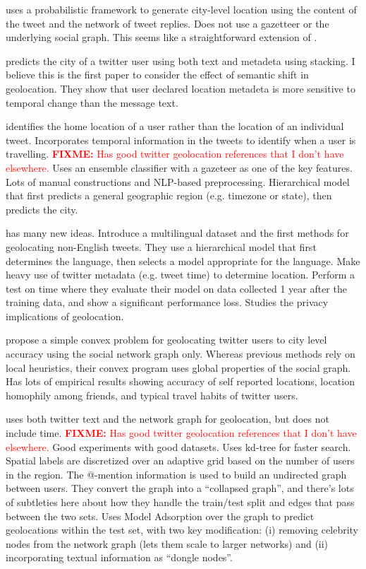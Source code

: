 \documentclass{article}
\newcommand{\fixme}[1]{\textcolor{red}{\textbf{FIXME:} {#1}}}
\begin{document}
\citet{li2012towards} uses a probabilistic framework to generate city-level location using the content of the tweet and the network of tweet replies.
Does not use a gazetteer or the underlying social graph.
This seems like a straightforward extension of \citet{cheng2010you}.

\citet{han2013stacking} predicts the city of a twitter user using both text and metadeta using stacking.
I believe this is the first paper to consider the effect of semantic shift in geolocation.
They show that user declared location metadeta is more sensitive to temporal change than the message text.

\citet{mahmud2014home} identifies the home location of a user rather than the location of an individual tweet.
Incorporates temporal information in the tweets to identify when a user is travelling.
\fixme{Has good twitter geolocation references that I don't have elsewhere.}
Uses an ensemble classifier with a gazeteer as one of the key features.
Lots of manual constructions and NLP-based preprocessing.
Hierarchical model that first predicts a general geographic region (e.g. timezone or state), then predicts the city.

\citet{han2014text} has many new ideas.
Introduce a multilingual dataset and the first methods for geolocating non-English tweets.
They use a hierarchical model that first determines the language,
then selects a model appropriate for the language.
Make heavy use of twitter metadata (e.g. tweet time) to determine location.
Perform a test on time where they evaluate their model on data collected 1 year after the training data, and show a significant performance loss.
Studies the privacy implications of geolocation.

\citet{compton2014geotagging} propose a simple convex problem for geolocating twitter users to city level accuracy using the social network graph only.
Whereas previous methods rely on local heuristics, their convex program uses global properties of the social graph.
Has lots of empirical results showing accuracy of self reported locations, location homophily among friends, and typical travel habits of twitter users.

\citet{rahimi2015twitter} uses both twitter text and the network graph for geolocation, but does not include time.
\fixme{Has good twitter geolocation references that I don't have elsewhere.}
Good experiments with good datasets.
Uses kd-tree for faster search.
Spatial labels are discretized over an adaptive grid based on the number of users in the region.
The @-mention information is used to build an undirected graph between users.
They convert the graph into a ``collapsed graph'', and there's lots of subtleties here about how they handle the train/test split and edges that pass between the two sets.
Uses Model Adsorption over the graph to predict geolocations within the test set, 
with two key modification:
(i) removing celebrity nodes from the network graph (lets them scale to larger networks)
and (ii) incorporating textual information as ``dongle nodes''.
\end{document}
